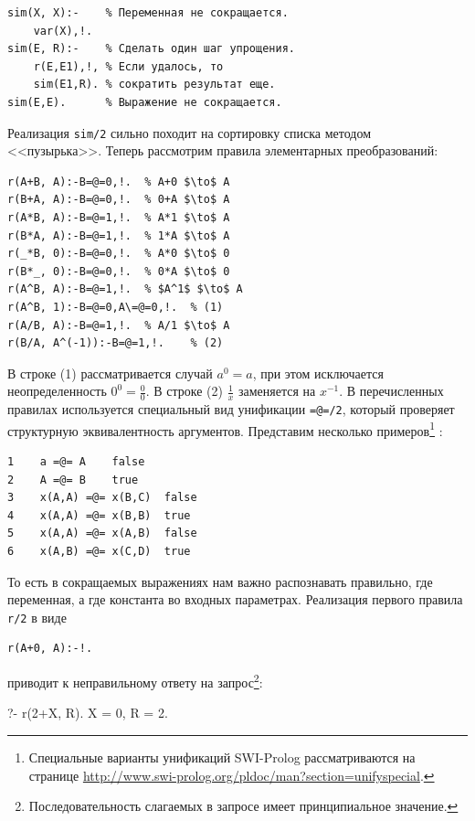 \documentclass[a4paper,14pt, openany, twoside, final]{extbook} %
\begin{document}
\begin{verbatim}
sim(X, X):-    % Переменная не сокращается.
    var(X),!.
sim(E, R):-    % Сделать один шаг упрощения.
    r(E,E1),!, % Если удалось, то
    sim(E1,R). % сократить результат еще.
sim(E,E).      % Выражение не сокращается.
\end{verbatim}

\noindent{}Реализация \texttt{sim/2} сильно походит на сортировку списка методом <<пузырька>>.  Теперь рассмотрим правила элементарных преобразований:

\begin{verbatim}
r(A+B, A):-B=@=0,!.  % A+0 $\to$ A
r(B+A, A):-B=@=0,!.  % 0+A $\to$ A
r(A*B, A):-B=@=1,!.  % A*1 $\to$ A
r(B*A, A):-B=@=1,!.  % 1*A $\to$ A
r(_*B, 0):-B=@=0,!.  % A*0 $\to$ 0
r(B*_, 0):-B=@=0,!.  % 0*A $\to$ 0
r(A^B, A):-B=@=1,!.  % $A^1$ $\to$ A
r(A^B, 1):-B=@=0,A\=@=0,!.  % (1)
r(A/B, A):-B=@=1,!.  % A/1 $\to$ A
r(B/A, A^(-1)):-B=@=1,!.    % (2)
\end{verbatim}

В строке (1) рассматривается случай $a^0=a$, при этом исключается неопределенность $0^0=\frac{0}{0}$.  В строке (2) $\frac{1}{x}$ заменяется на $x^{-1}$.  В перечисленных правилах используется специальный вид унификации \texttt{=@=/2}, который проверяет структурную эквивалентность аргументов.  Представим несколько примеров\footnote{Специальные варианты унификаций SWI-Prolog рассматриваются на странице \url{http://www.swi-prolog.org/pldoc/man?section=unifyspecial}.} \cite{SWIP}:

\begin{verbatim}
1    a =@= A    false
2    A =@= B    true
3    x(A,A) =@= x(B,C)  false
4    x(A,A) =@= x(B,B)  true
5    x(A,A) =@= x(A,B)  false
6    x(A,B) =@= x(C,D)  true
\end{verbatim}

То есть в сокращаемых выражениях нам важно распознавать правильно, где переменная, а где константа во входных параметрах.  Реализация первого правила \texttt{r/2} в виде

\begin{verbatim}
r(A+0, A):-!.
\end{verbatim}

\noindent{}приводит к неправильному ответу на запрос\footnote{Последовательность слагаемых в запросе имеет принципиальное значение.}:

\begin{proexp}
?- r(2+X, R).
X = 0,
R = 2.
\end{proexp}
\end{document}
